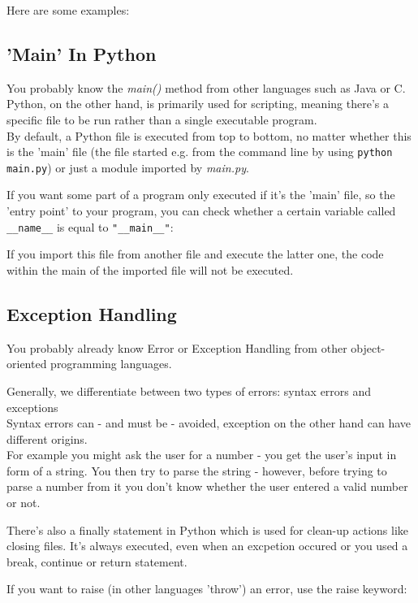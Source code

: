         Here are some examples:


    \subsection{'Main' In Python}
        You probably know the \textit{main()} method from other languages such as Java or C. \\
        Python, on the other hand, is primarily used for scripting, meaning there's a specific file
        to be run rather than a single executable program. \\
        By default, a Python file is executed from top to bottom, no matter whether this is the
        'main' file (the file started e.g. from the command line by using
        \texttt{python main.py}) or just a module imported by \textit{main.py}.

        If you want some part of a program only executed if it's the 'main' file, so the
        'entry point' to your program, you can check whether a certain variable called
        \texttt{__name__} is equal to \texttt{"__main__"}:


        If you import this file from another file and execute the latter one, the code within the
        main of the imported file will not be executed.


    \subsection{Exception Handling}
        You probably already know Error or Exception Handling from other object-oriented
        programming languages.

        Generally, we differentiate between two types of errors: syntax errors and exceptions \\
        Syntax errors can - and must be - avoided, exception on the other hand can have different
        origins. \\
        For example you might ask the user for a number - you get the user's input in form
        of a string. You then try to parse the string - however, before trying to parse a number
        from it you don't know whether the user entered a valid number or not.

        There's also a finally statement in Python which is used for clean-up actions like
        closing files. It's always executed, even when an excpetion occured or you used a break,
        continue or return statement.


        If you want to raise (in other languages 'throw') an error, use the raise keyword:
